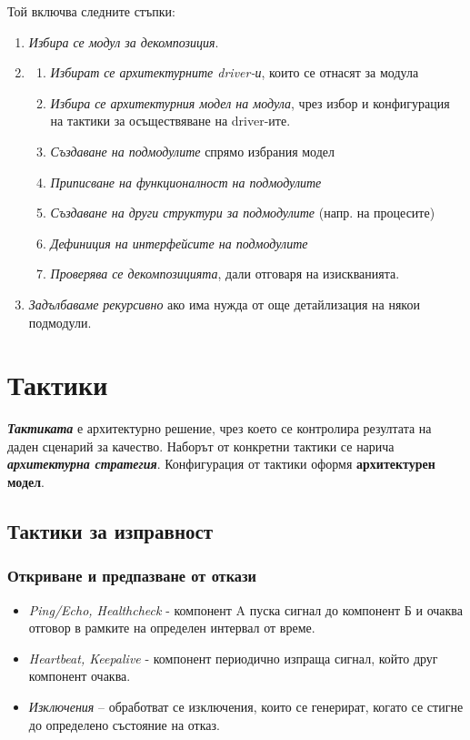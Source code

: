 \documentclass[fleqn,12pt]{article}
\begin{document}
Той включва следните стъпки:
\begin{enumerate}
    \item \textit{Избира се модул за декомпозиция}.
    \item \begin{enumerate}
        \item \textit{Избират се архитектурните driver-и}, които се отнасят за модула
        \item \textit{Избира се архитектурния модел на модула}, чрез избор и конфигурация на тактики за осъществяване на driver-ите.
        \item \textit{Създаване на подмодулите} спрямо избрания модел
        \item \textit{Приписване на функционалност на подмодулите}
        \item \textit{Създаване на други структури за подмодулите} (напр. на процесите)
        \item \textit{Дефиниция на интерфейсите на подмодулите}
        \item \textit{Проверява се декомпозицията}, дали отговаря на изискванията.
    \end{enumerate}
    \item \textit{Задълбаваме рекурсивно} ако има нужда от още детайлизация на някои подмодули.
\end{enumerate}


\section{Тактики}

\textbf{\textit{Тактиката}} е архитектурно решение, чрез което се контролира
резултата на даден сценарий за качество. Наборът от конкретни
тактики се нарича \textbf{\textit{архитектурна стратегия}}.
Конфигурация от тактики оформя \textbf{архитектурен модел}.

\subsection{Тактики за изправност}

\subsubsection{Откриване и предпазване от откази}
\begin{itemize}
\item \textit{Ping/Echo, Healthcheck} - компонент A пуска сигнал до компонент Б и очаква отговор в рамките на определен интервал от време.
\item \textit{Heartbeat, Keepalive} - компонент периодично изпраща сигнал, който друг компонент очаква.
\item \textit{Изключения} – обработват се изключения, които се генерират, когато се стигне до определено състояние на отказ.
\end{itemize}
\end{document}
